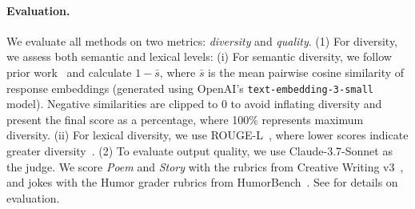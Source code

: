 \paragraph{Evaluation.}
We evaluate all methods on two metrics: \textit{diversity} and \textit{quality}. (1) For diversity, we assess both semantic and lexical levels: (i) For semantic diversity, we follow prior work~\citep{cox2021directed,cann2023usingsemanticsimilaritytext,lu2025aihumanityssalieriquantifying,zhu2025bareleveragingbaselanguage} and calculate $1 - \bar{s}$, where $\bar{s}$ is the mean pairwise cosine similarity of response embeddings (generated using OpenAI's \texttt{text-embedding-3-small} model). Negative similarities are clipped to 0 to avoid inflating diversity and present the final score as a percentage, where 100\% represents maximum diversity. 
(ii) For lexical diversity, we use ROUGE-L~\citep{lin-2004-rouge}, where lower scores indicate greater diversity~\citep{shaib2025standardizingmeasurementtextdiversity}. 
(2) To evaluate output quality, we use Claude-3.7-Sonnet as the judge. We score \textit{Poem} and \textit{Story} with the rubrics from Creative Writing v3~\citep{paech2023eqbench}, and jokes with the Humor grader rubrics from HumorBench~\citep{narad2025llmsjokeprobingnonstem}. See  for details on evaluation.




